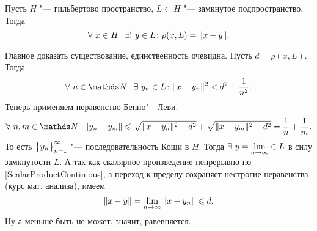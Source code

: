 \begin{The}
  Пусть $H$ "--- гильбертово пространство, $L\subset H$ "--- замкнутое подпространство. Тогда
\[
  \forall\ x\in H\pau \exists!\ y\in L\colon \rho(x,L) = \|x-y\|.
\]
\end{The}
\begin{Proof}
 Главное доказать существование, единственность очевидна.
 Пусть $d= \rho(x,L)$. Тогда
\[
 \forall\ n\in\N\pau \exists\ y_n\in L\colon \|x-y_n\|^2 < d^2+\frac1{n^2}.
\]
Теперь применяем неравенство Беппо"--~Леви.
\[
  \forall\ n,m\in\N\pau \|y_n-y_m\|\le \sqrt{\|x-y_n\|^2-d^2} + \sqrt{\|x-y_m\|^2-d^2} = \frac1n+\frac1m.
\]
То есть $\big\{{y}_{n}\big\}_{n=1}^\infty$ "--- последовательность Коши в $H$. Тогда $\exists\ y = \lim\limits_{n\rightarrow\infty}\in L$ в силу замкнутости $L$. А так как скалярное произведение непрерывно по \ref{ScalarProductContinious}, а переход к пределу сохраняет нестрогие неравенства (курс мат. анализа), имеем
\[
  \|x-y\| = \lim\limits_{n\rightarrow\infty}\|x-y_n\| \leqslant d.
\]
Ну а меньше быть не может, значит, равевняется.
\end{Proof}

